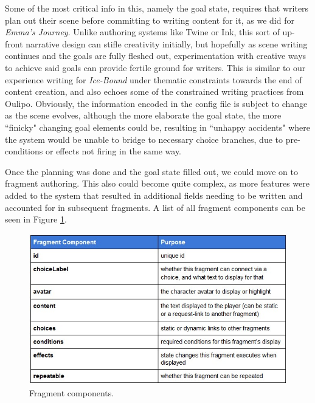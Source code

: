 
Some of the most critical info in this, namely the goal state, requires that writers plan out their scene before committing to writing content for it, as we did for \textit{Emma's Journey}. Unlike authoring systems like Twine or Ink, this sort of up-front narrative design can stifle creativity initially, but hopefully as scene writing continues and the goals are fully fleshed out, experimentation with creative ways to achieve said goals can provide fertile ground for writers. This is similar to our experience writing for \textit{Ice-Bound} under thematic constraints towards the end of content creation, and also echoes some of the constrained writing practices from Oulipo. Obviously, the information encoded in the config file is subject to change as the scene evolves, although the more elaborate the goal state, the more ``finicky" changing goal elements could be, resulting in ``unhappy accidents" where the system would be unable to bridge to necessary choice branches, due to pre-conditions or effects not firing in the same way.

Once the planning was done and the goal state filled out, we could move on to fragment authoring. This also could become quite complex, as more features were added to the system that resulted in additional fields needing to be written and accounted for in subsequent fragments. A list of all fragment components can be seen in Figure \ref{fig:fragment-components}.


\begin{figure}
    \centering
    \includegraphics[width=\textwidth]{figures/3-StoryAssembler/fragment-components.jpg}
    \caption{Fragment components.}
    \label{fig:fragment-components}
\end{figure}

